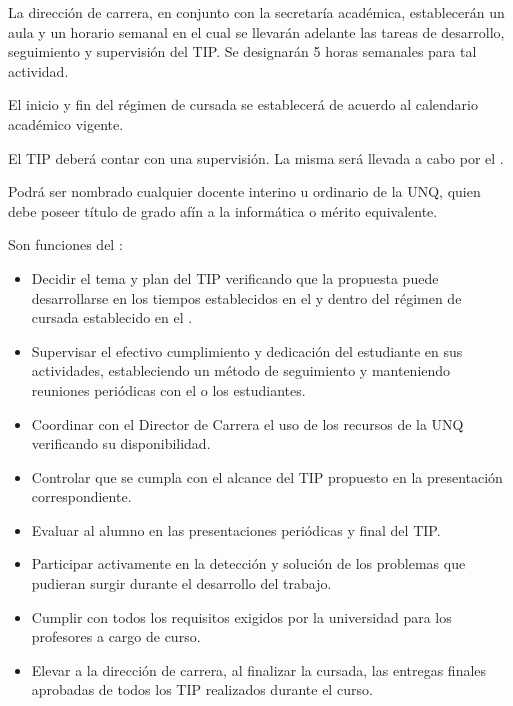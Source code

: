 \articulo La dirección de carrera, en conjunto con la secretaría académica,
establecerán un aula y un horario semanal en el cual se llevarán adelante las
tareas de desarrollo, seguimiento y supervisión del TIP. Se designarán 5 horas
semanales para tal actividad.

\articulo El inicio y fin del régimen de cursada se establecerá de acuerdo al
calendario académico vigente. 


\articulo El TIP deberá contar con una supervisión. La misma será llevada a
cabo por el \profesorTIP{}. 

\articulo Podrá ser nombrado \profesorTIP{} cualquier docente interino u
ordinario de la UNQ, quien debe poseer título de grado afín a la informática o
mérito equivalente.

\articulo Son funciones del \profesorTIP{}:
\begin{itemize}
 \item Decidir el tema y plan del TIP verificando que la
 propuesta puede desarrollarse en los tiempos establecidos en el
 \artHoras{} y dentro del régimen de cursada establecido en el \artRegimen.
 \item Supervisar el efectivo cumplimiento y dedicación del estudiante en
 sus actividades, estableciendo un método de seguimiento y
 manteniendo reuniones periódicas con el o los estudiantes.
 \item Coordinar con el Director de Carrera el uso de los recursos de la
 UNQ verificando su disponibilidad.
 \item Controlar que se cumpla con el alcance del TIP propuesto en la
 presentación correspondiente.
 \item Evaluar al alumno en las presentaciones periódicas y final del TIP.
 \item Participar activamente en la detección y solución de los problemas
 que pudieran surgir durante el desarrollo del trabajo.
 \item Cumplir con todos los requisitos exigidos por la universidad para los
 profesores a cargo de curso.
 \item Elevar a la dirección de carrera, al finalizar la cursada, las entregas
 finales aprobadas de todos los TIP realizados durante el curso.
\end{itemize}

